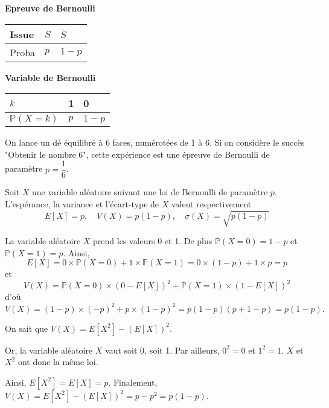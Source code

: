 \documentclass[11pt,fleqn, openany]{book} %
\begin{document}
\noindent\begin{minipage}{0.49\linewidth}
\begin{center}
\textbf{Epreuve de Bernoulli}
\renewcommand{\arraystretch}{1.2}
\begin{tabularx}{0.8\linewidth}{|X|X|X|}
\hline
Issue & $S$ & $\overline{S}$\\
\hline
Proba & $p$ & $1-p$\\
\hline
\end{tabularx}
\end{center}
\end{minipage}\hfill\begin{minipage}{0.49\linewidth}
\begin{center}
\textbf{Variable de Bernoulli}
\renewcommand{\arraystretch}{1.2}
\begin{tabularx}{0.8\linewidth}{|X|X|X|}
\hline
$k$ & 1 & 0\\
\hline
$\mathbb{P}(X=k)$ & $p$ & $1-p$\\
\hline
\end{tabularx}
\end{center}
\end{minipage}



\begin{example}On lance un dé équilibré à 6 faces, numérotées de 1 à 6. Si on considère le succès "Obtenir le nombre 6", cette expérience est une épreuve de Bernoulli de paramètre $p=\dfrac{1}{6}$. \end{example}

\begin{proposition}Soit $X$ une variable aléatoire suivant une loi de Bernoulli de paramètre $p$. L'espérance, la variance et l'écart-type de $X$ valent respectivement \[E[X]=p, \quad V(X)=p(1-p), \quad \sigma(X)=\sqrt{p(1-p)}\]\end{proposition}



\begin{demonstration} La variable aléatoire $X$ prend les valeurs 0 et 1. De plus $\mathbb{P}(X=0)=1-p$ et \\ $\mathbb{P}(X=1)=p$. Ainsi,
\[E[X] = 0 \times \mathbb{P}(X=0)+1 \times \mathbb{P}(X=1)=0 \times (1-p)+1 \times p = p\]
et
\[V(X)=\mathbb{P}(X=0) \times (0- E[X])^2 + \mathbb{P}(X=1) \times (1- E[X])^2\]
d'où
\[V(X)=(1-p) \times (-p)^2+p \times (1-p)^2=p(1-p)(p+1-p)=p(1-p).\]
\end{demonstration}

\begin{demonstration}
On sait que $V(X)=E[X^2]-(E[X])^2$.

Or, la variable aléatoire $X$ vaut soit 0, soit 1. Par ailleurs, $0^2=0$ et $1^2=1$. $X$ et $X^2$ ont donc la même loi. 

Ainsi, $E[X^2]=E[X]=p$. Finalement, $V(X)=E[X^2]-(E[X])^2=p-p^2=p(1-p)$.

\end{demonstration}
\end{document}
